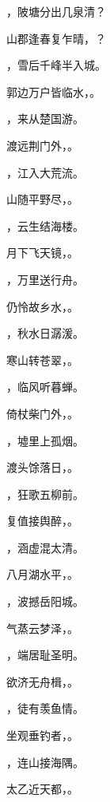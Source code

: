 \documentclass[12pt, a4paper, addpoints, answers]{exam}
\begin{document}
\begin{questions}
\question[3] ，陂塘分出几泉清？

\question[3] 山郡逢春复乍晴，？

\question[3] ，雪后千峰半入城。

\question[3] 郭边万户皆临水，。

\question[3] ，来从楚国游。

\question[3] 渡远荆门外，。

\question[3] ，江入大荒流。

\question[3] 山随平野尽，。

\question[3] ，云生结海楼。

\question[3] 月下飞天镜，。

\question[3] ，万里送行舟。

\question[3] 仍怜故乡水，。

\question[3] ，秋水日潺湲。

\question[3] 寒山转苍翠，。

\question[3] ，临风听暮蝉。

\question[3] 倚杖柴门外，。

\question[3] ，墟里上孤烟。

\question[3] 渡头馀落日，。

\question[3] ，狂歌五柳前。

\question[3] 复值接舆醉，。

\question[3] ，涵虚混太清。

\question[3] 八月湖水平，。

\question[3] ，波撼岳阳城。

\question[3] 气蒸云梦泽，。

\question[3] ，端居耻圣明。

\question[3] 欲济无舟楫，。

\question[3] ，徒有羡鱼情。

\question[3] 坐观垂钓者，。

\question[3] ，连山接海隅。

\question[3] 太乙近天都，。


\end{questions}
\end{document}
